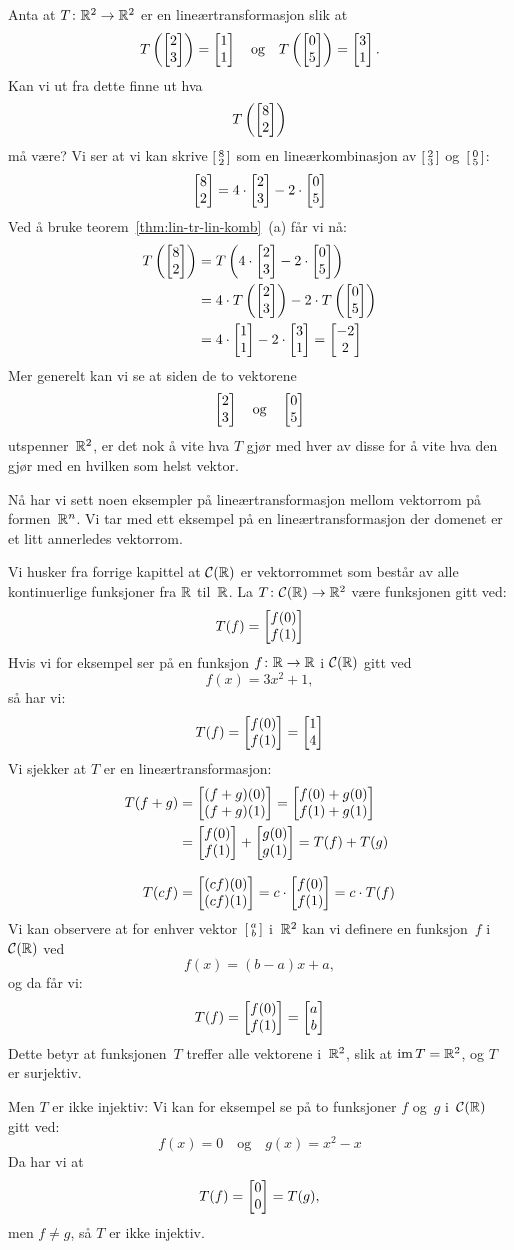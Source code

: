 \begin{ex}
Anta at $T \colon \R^2 \to \R^2$ er en lineærtransformasjon slik at
\[
T\left( \vv{2}{3} \right) = \vv{1}{1}
\quad\text{og}\quad
T\left( \vv{0}{5} \right) = \vv{3}{1}.
\]
Kan vi ut fra dette finne ut hva
\[
T\left( \vv{8}{2} \right)
\]
må være?  Vi ser at vi kan skrive $\vvS{8}{2}$ som en
lineærkombinasjon av $\vvS{2}{3}$ og~$\vvS{0}{5}$:
\[
\vv{8}{2} = 4 \cdot \vv{2}{3} - 2 \cdot \vv{0}{5}
\]
Ved å bruke teorem~\ref{thm:lin-tr-lin-komb}~(a) får vi nå:
\begin{align*}
T\left( \vv{8}{2} \right)
&= T\left( 4 \cdot \vv{2}{3} - 2 \cdot \vv{0}{5} \right) \\
&= 4 \cdot T\left( \vv{2}{3} \right) - 2 \cdot T\left( \vv{0}{5} \right) \\
&= 4 \cdot \vv{1}{1} - 2 \cdot \vv{3}{1}
 = \vv{-2}{2}
\end{align*}
Mer generelt kan vi se at siden de to vektorene
\[
\vv{2}{3}
\quad\text{og}\quad
\vv{0}{5}
\]
utspenner~$\R^2$, er det nok å vite hva $T$ gjør med hver av disse for
å vite hva den gjør med en hvilken som helst vektor.
\end{ex}

Nå har vi sett noen eksempler på lineærtransformasjon mellom vektorrom
på formen~$\R^n$.  Vi tar med ett eksempel på en lineærtransformasjon
der domenet er et litt annerledes vektorrom.

\begin{ex}
Vi husker fra forrige kapittel at $\Cf(\R)$ er vektorrommet som består
av alle kontinuerlige funksjoner fra $\R$ til~$\R$.  La
$T \colon \Cf(\R) \to \R^2$ være funksjonen gitt ved:
\[
T(f) = \vv{f(0)}{f(1)}
\]
Hvis vi for eksempel ser på en funksjon $f \colon \R \to \R$ i
$\Cf(\R)$ gitt ved
\[
f(x) = 3x^2 + 1,
\]
så har vi:
\[
T(f) = \vv{f(0)}{f(1)} = \vv{1}{4}
\]
Vi sjekker at $T$ er en lineærtransformasjon:
\begin{align*}
T(f + g)
&= \vv{(f+g)(0)}{(f+g)(1)}
 = \vv{f(0) + g(0)}{f(1) + g(1)} \\
&= \vv{f(0)}{f(1)} + \vv{g(0)}{g(1)}
 = T(f) + T(g) \\[8pt]
T(cf)
&= \vv{(cf)(0)}{(cf)(1)}
 = c \cdot \vv{f(0)}{f(1)}
 = c \cdot T(f)
\end{align*}
Vi kan observere at for enhver vektor~$\vvS{a}{b}$ i~$\R^2$ kan vi
definere en funksjon~$f$ i~$\Cf(\R)$ ved
\[
f(x) = (b - a) x + a,
\]
og da får vi:
\[
T(f) = \vv{f(0)}{f(1)} = \vv{a}{b}
\]
Dette betyr at funksjonen~$T$ treffer alle vektorene i~$\R^2$, slik at
$\im T = \R^2$, og $T$ er surjektiv.

Men $T$ er ikke injektiv: Vi kan for eksempel se på to funksjoner $f$
og~$g$ i~$\Cf(\R)$ gitt ved:
\[
f(x) = 0
\quad\text{og}\quad
g(x) = x^2 - x
\]
Da har vi at
\[
T(f) = \vv{0}{0} = T(g),
\]
men $f \ne g$, så $T$ er ikke injektiv.
\end{ex}


